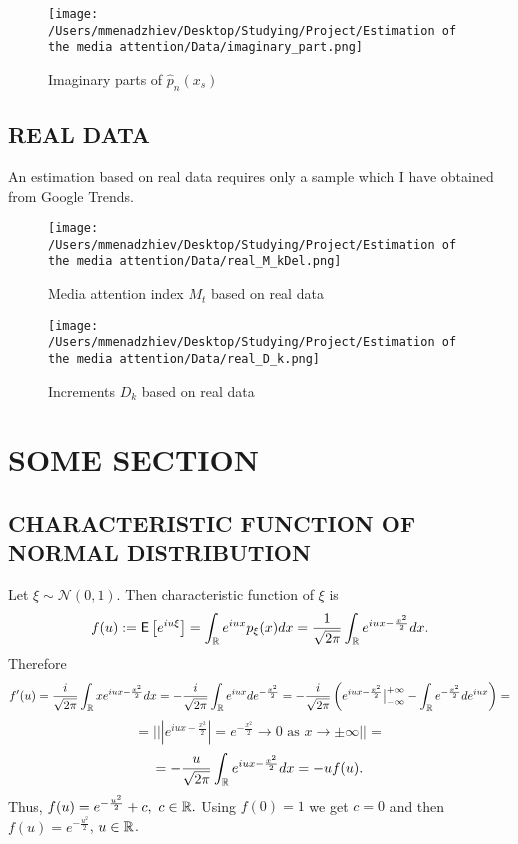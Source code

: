 \begin{figure}[H]
    \centering
    \texttt{[image: /Users/mmenadzhiev/Desktop/Studying/Project/Estimation of the media attention/Data/imaginary\_part.png]}
    \caption{Imaginary parts of $\hat{p}_n (x_s)$}
\end{figure}

\subsection{REAL DATA}

An estimation based on real data requires only a sample which I have obtained from Google Trends. 

\begin{figure}[H]
    \centering
    \texttt{[image: /Users/mmenadzhiev/Desktop/Studying/Project/Estimation of the media attention/Data/real\_M\_kDel.png]}
    \caption{Media attention index $M_t$ based on real data}
\end{figure}

\begin{figure}[H]
    \centering
    \texttt{[image: /Users/mmenadzhiev/Desktop/Studying/Project/Estimation of the media attention/Data/real\_D\_k.png]}
    \caption{Increments $D_k$ based on real data}
\end{figure}

\section{SOME SECTION}

\subsection{CHARACTERISTIC FUNCTION OF NORMAL DISTRIBUTION}

Let $\xi \sim \mathcal N (0, 1)$. Then characteristic function of $\xi$ is \[ f(u) := \textsf E \left[ e^{iu\xi} \right] = \int_{\mathbb R} e^{iux} p_{\xi}(x) dx = \frac{1}{\sqrt{2 \pi}} \int_{\mathbb R} e^{iux - \frac{x^2}{2}} dx. \] Therefore \[ f'(u) = \frac{i}{\sqrt{2 \pi}} \int_{\mathbb R} x e^{iux - \frac{x^2}{2}} dx = - \frac{i}{\sqrt{2 \pi}} \int_{\mathbb R} e^{iux} d e^{-\frac{x^2}{2}} = - \frac{i}{\sqrt{2 \pi}} \left( e^{iux - \frac{x^2}{2}} \big|_{-\infty}^{+\infty} - \int_{\mathbb R} e^{-\frac{x^2}{2}} d e^{iux} \right) = \] \[ = \Bigg| \Bigg| \left| e^{iux - \frac{x^2}{2}} \right| = e^{-\frac{x^2}{2}} \longrightarrow 0 \text{ as } x \rightarrow \pm \infty \Bigg| \Bigg| = \] \[ = - \frac{u}{\sqrt{2 \pi}} \int_{\mathbb R} e^{iux - \frac{x^2}{2}} dx = -u f(u). \] Thus, $f(u) = e^{-\frac{u^2}{2}} + c, \text{ } c \in \mathbb R.$ Using $f(0) = 1$ we get $c = 0$ and then $f(u) = e^{-\frac{u^2}{2}}$, $u \in \mathbb R$.

